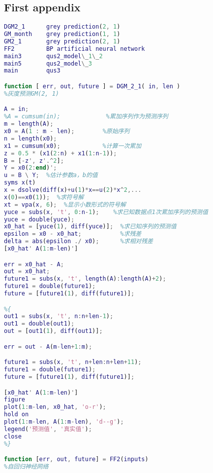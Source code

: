 \documentclass{mcmthesis}
\begin{document}
\begin{appendices}

\section{First appendix}
\appendix

\begin{lstlisting}[language=matlab]
DGM2_1   	grey prediction(2, 1)
GM_month 	grey prediction(1, 1)
GM2_1 		grey prediction(2, 1)
FF2 		BP artificial neural network
main3		qus2_model\_1\_2
main5		qus2_model\_3
main		qus3

function [ err, out, future ] = DGM_2_1( in, len )
%灰度预测GM(2, 1)

A = in;
%A = cumsum(in);             %累加序列作为预测序列
m = length(A);
x0 = A(1 : m - len);        %原始序列
n = length(x0);
x1 = cumsum(x0);            %计算一次累加
z = 0.5 * (x1(2:n) + x1(1:n-1));
B = [-z', z'.^2];
Y = x0(2:end)';
u = B \ Y;  %估计参数a，b的值
syms x(t)
x = dsolve(diff(x)+u(1)*x==u(2)*x^2,...
x(0)==x0(1));  %求符号解
xt = vpa(x, 6);  %显示小数形式的符号解
yuce = subs(x, 't', 0:n-1);    %求已知数据点1次累加序列的预测值
yuce = double(yuce);
x0_hat = [yuce(1), diff(yuce)];  %求已知序列的预测值
epsilon = x0 - x0_hat;           %求残差
delta = abs(epsilon ./ x0);      %求相对残差
[x0_hat' A(1:m-len)']

err = x0_hat - A;
out = x0_hat;
future1 = subs(x, 't', length(A):length(A)+2);
future1 = double(future1);
future = [future1(1), diff(future1)];

%{
out1 = subs(x, 't', n:n+len-1);
out1 = double(out1);
out = [out1(1), diff(out1)];

err = out - A(m-len+1:m);

future1 = subs(x, 't', n+len:n+len+11);
future1 = double(future1);
future = [future1(1), diff(future1)];

[x0_hat' A(1:m-len)']
figure
plot(1:m-len, x0_hat, 'o-r');
hold on
plot(1:m-len, A(1:m-len), 'd--g');
legend('预测值', '真实值');
close
%}

function [err, out, future] = FF2(inputs)
%自回归神经网络


\end{lstlisting}
\end{appendices}
\end{document}
